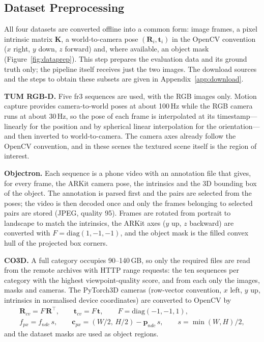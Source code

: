\documentclass[journal]{IEEEtran}
\newcommand{\R}{\mathbf{R}}
\newcommand{\tv}{\mathbf{t}}
\newcommand{\K}{\mathbf{K}}
\begin{document}
\subsection{Dataset Preprocessing}\label{sec:prep}
All four datasets are converted offline into a common form: image frames, a pixel intrinsic matrix $\K$, a world-to-camera pose $(\R_i,\tv_i)$ in the OpenCV convention ($x$ right, $y$ down, $z$ forward) and, where available, an object mask (Figure~\ref{fig:dataprep}). This step prepares the evaluation data and its ground truth only; the pipeline itself receives just the two images. The download sources and the steps to obtain these subsets are given in Appendix~\ref{app:download}.

\textbf{TUM RGB-D.} Five fr3 sequences are used, with the RGB images only. Motion capture provides camera-to-world poses at about 100\,Hz while the RGB camera runs at about 30\,Hz, so the pose of each frame is interpolated at its timestamp---linearly for the position and by spherical linear interpolation for the orientation---and then inverted to world-to-camera. The camera axes already follow the OpenCV convention, and in these scenes the textured scene itself is the region of interest.

\textbf{Objectron.} Each sequence is a phone video with an annotation file that gives, for every frame, the ARKit camera pose, the intrinsics and the 3D bounding box of the object. The annotation is parsed first and the pairs are selected from the poses; the video is then decoded once and only the frames belonging to selected pairs are stored (JPEG, quality 95). Frames are rotated from portrait to landscape to match the intrinsics, the ARKit axes ($y$ up, $z$ backward) are converted with $F=\mathrm{diag}(1,-1,-1)$, and the object mask is the filled convex hull of the projected box corners.

\textbf{CO3D.} A full category occupies 90--140\,GB, so only the required files are read from the remote archives with HTTP range requests: the ten sequences per category with the highest viewpoint-quality score, and from each only the images, masks and cameras. The PyTorch3D cameras (row-vector convention, $x$ left, $y$ up, intrinsics in normalised device coordinates) are converted to OpenCV by
\begin{gather}
  \R_{cv} = F\,\R^\top,\qquad \tv_{cv} = F\,\tv,\qquad F=\mathrm{diag}(-1,-1,1),\\
  f_{px} = f_{ndc}\,s,\qquad \mathbf{c}_{px} = (W/2,\,H/2) - \mathbf{p}_{ndc}\,s,\qquad s=\min(W,H)/2 ,
\end{gather}
and the dataset masks are used as object regions.
\end{document}
